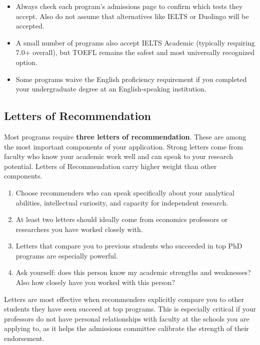 \documentclass[11pt, letterpaper]{article}
\begin{document}
\begin{itemize}[leftmargin=*, itemsep=2pt]
    \item Always check each program's admissions page to confirm which tests they accept. Also do not assume that alternatives like IELTS or Duolingo will be accepted.
    \item A small number of programs also accept IELTS Academic (typically requiring 7.0+ overall), but TOEFL remains the safest and most universally recognized option.
    \item Some programs waive the English proficiency requirement if you completed your undergraduate degree at an English-speaking institution.
\end{itemize}


\subsection{Letters of Recommendation}

Most programs require \textbf{three letters of recommendation}. These are among the most important components of your application. Strong letters come from faculty who know your academic work well and can speak to your research potential. Letters of Recommendation carry higher weight than other components.

\begin{enumerate}[leftmargin=*, itemsep=2pt]
    \item Choose recommenders who can speak specifically about your analytical abilities, intellectual curiosity, and capacity for independent research.
    \item At least two letters should ideally come from economics professors or researchers you have worked closely with.
    \item Letters that compare you to previous students who succeeded in top PhD programs are especially powerful.
    \item Ask yourself: does this person know my academic strengths and weaknesses? Also how closely have you worked with this person?
\end{enumerate}

\begin{tipbox}
Letters are most effective when recommenders explicitly compare you to other students they have seen succeed at top programs. This is especially critical if your professors do not have personal relationships with faculty at the schools you are applying to, as it helps the admissions committee calibrate the strength of their endorsement.
\end{tipbox}
\end{document}
